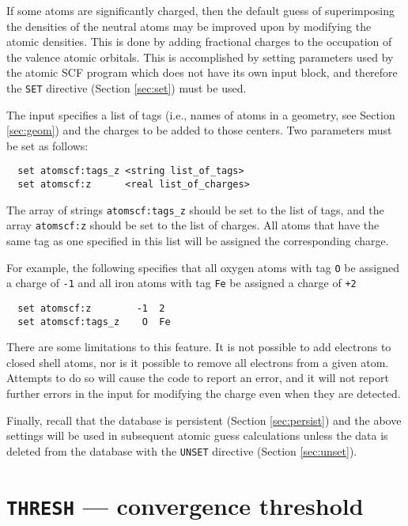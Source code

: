 If some atoms are significantly charged, then the default guess of
superimposing the densities of the neutral atoms may be improved upon
by modifying the atomic densities.  This is done by adding fractional
charges to the occupation of the valence atomic orbitals.  This is
accomplished by setting parameters used by the atomic SCF program which
does not have its own input block, and therefore the \verb+SET+
directive (Section \ref{sec:set}) must be used.

The input specifies a list of tags (i.e., names of atoms in a
geometry, see Section \ref{sec:geom}) and the charges to be added to
those centers.  Two parameters must be set as follows:
\begin{verbatim}
  set atomscf:tags_z <string list_of_tags>
  set atomscf:z      <real list_of_charges>
\end{verbatim}

\sloppy

The array of strings \verb+atomscf:tags_z+ should be set to the list
of tags, and the array \verb+atomscf:z+ should be set to the list of
charges.  All atoms that have the same tag as one specified in this
list will be assigned the corresponding charge.

\fussy

For example, the following specifies that all oxygen atoms with tag
\verb+O+ be assigned a charge of \verb+-1+ and all iron atoms with tag
\verb+Fe+ be assigned a charge of \verb=+2=
\begin{verbatim}
  set atomscf:z        -1  2
  set atomscf:tags_z    O  Fe
\end{verbatim}

There are some limitations to this feature.  It is not possible to add
electrons to closed shell atoms, nor is it possible to remove all
electrons from a given atom.  Attempts to do so will cause the code to
report an error, and it will not report further errors in the input
for modifying the charge even when they are detected.

Finally, recall that the database is persistent (Section
\ref{sec:persist}) and the above settings will be used in subsequent
atomic guess calculations unless the data is deleted from the database
with the \verb+UNSET+ directive (Section \ref{sec:unset}).


\section{{\tt THRESH} --- convergence threshold}
\label{sec:thresh}

